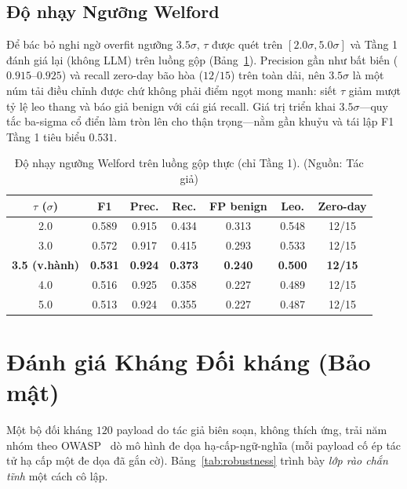 \subsection{Độ nhạy Ngưỡng Welford}
Để bác bỏ nghi ngờ overfit ngưỡng $3.5\sigma$, $\tau$ được quét trên $[2.0\sigma, 5.0\sigma]$ và Tầng 1 đánh giá lại (không LLM) trên luồng gộp (Bảng~\ref{tab:sensitivity}). Precision gần như bất biến ($0.915$--$0.925$) và recall zero-day bão hòa ($12/15$) trên toàn dải, nên $3.5\sigma$ là một núm tải điều chỉnh được chứ không phải điểm ngọt mong manh: siết $\tau$ giảm mượt tỷ lệ leo thang và báo giả benign với cái giá recall. Giá trị triển khai $3.5\sigma$---quy tắc ba-sigma cổ điển làm tròn lên cho thận trọng---nằm gần khuỷu và tái lập F1 Tầng 1 tiêu biểu $0.531$.

\begin{table}[!htbp]
    \centering \footnotesize \setlength{\tabcolsep}{5pt}
    \caption{Độ nhạy ngưỡng Welford trên luồng gộp thực (chỉ Tầng 1). (Nguồn: Tác giả)}
    \label{tab:sensitivity}
    \begin{tabular}{|c|c|c|c|c|c|c|}
        \hline
        \textbf{$\tau$ ($\sigma$)} & \textbf{F1} & \textbf{Prec.} & \textbf{Rec.} & \textbf{FP benign} & \textbf{Leo.} & \textbf{Zero-day} \\ \hline
        2.0 & 0.589 & 0.915 & 0.434 & 0.313 & 0.548 & 12/15 \\ \hline
        3.0 & 0.572 & 0.917 & 0.415 & 0.293 & 0.533 & 12/15 \\ \hline
        \textbf{3.5 (v.hành)} & \textbf{0.531} & \textbf{0.924} & \textbf{0.373} & \textbf{0.240} & \textbf{0.500} & \textbf{12/15} \\ \hline
        4.0 & 0.516 & 0.925 & 0.358 & 0.227 & 0.489 & 12/15 \\ \hline
        5.0 & 0.513 & 0.924 & 0.355 & 0.227 & 0.487 & 12/15 \\ \hline
    \end{tabular}
\end{table}

\section{Đánh giá Kháng Đối kháng (Bảo mật)}
Một bộ đối kháng $120$ payload do tác giả biên soạn, không thích ứng, trải năm nhóm theo OWASP~\cite{owasp_llm2025} dò mô hình đe dọa hạ-cấp-ngữ-nghĩa (mỗi payload cố ép tác tử hạ cấp một đe dọa đã gắn cờ). Bảng~\ref{tab:robustness} trình bày \emph{lớp rào chắn tĩnh} một cách cô lập.

